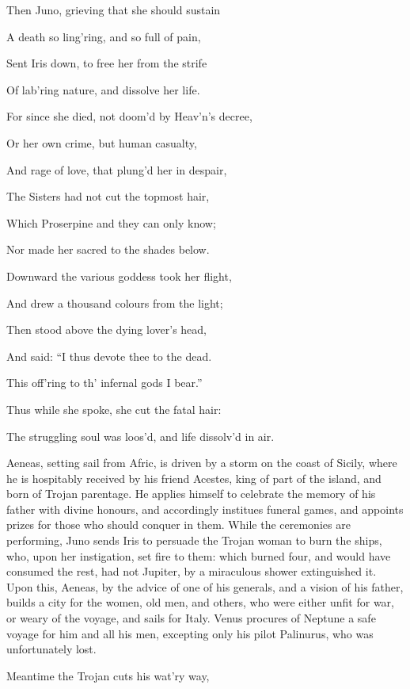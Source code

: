 Then Juno, grieving that she should sustain

A death so ling’ring, and so full of pain,

Sent Iris down, to free her from the strife

Of lab’ring nature, and dissolve her life.

For since she died, not doom’d by Heav’n’s decree,

Or her own crime, but human casualty,

And rage of love, that plung’d her in despair,

The Sisters had not cut the topmost hair,

Which Proserpine and they can only know;

Nor made her sacred to the shades below.

Downward the various goddess took her flight,

And drew a thousand colours from the light;

Then stood above the dying lover’s head,

And said: “I thus devote thee to the dead.

This off’ring to th’ infernal gods I bear.”

Thus while she spoke, she cut the fatal hair:

The struggling soul was loos’d, and life dissolv’d in air.


Aeneas, setting sail from Afric, is driven by a storm on the coast of Sicily,
where he is hospitably received by his friend Acestes, king of part of the
island, and born of Trojan parentage. He applies himself to celebrate the
memory of his father with divine honours, and accordingly institues funeral
games, and appoints prizes for those who should conquer in them. While the
ceremonies are performing, Juno sends Iris to persuade the Trojan woman to
burn the ships, who, upon her instigation, set fire to them: which burned
four, and would have consumed the rest, had not Jupiter, by a miraculous
shower extinguished it. Upon this, Aeneas, by the advice of one of his generals,
and a vision of his father, builds a city for the women, old men, and others,
who were either unfit for war, or weary of the voyage, and sails for Italy.
Venus procures of Neptune a safe voyage for him and all his men, excepting
only his pilot Palinurus, who was unfortunately lost.

Meantime the Trojan cuts his wat’ry way,

